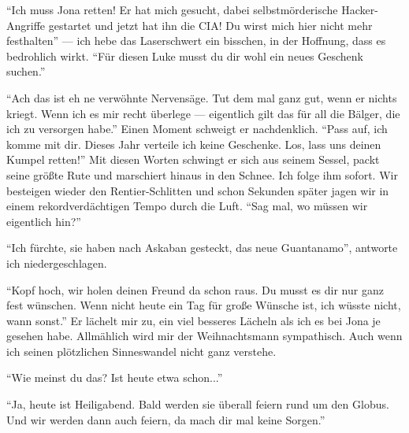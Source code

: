 "`Ich muss Jona retten! Er hat mich gesucht, dabei selbstmörderische Hacker-Angriffe gestartet und jetzt hat ihn die CIA! Du wirst mich hier nicht mehr festhalten"' — ich hebe das Laserschwert ein bisschen, in der Hoffnung, dass es bedrohlich wirkt. "`Für diesen Luke musst du dir wohl ein neues Geschenk suchen."'

"`Ach das ist eh ne verwöhnte Nervensäge. Tut dem mal ganz gut, wenn er nichts kriegt. Wenn ich es mir recht überlege — eigentlich gilt das für all die Bälger, die ich zu versorgen habe."' Einen Moment schweigt er nachdenklich. "`Pass auf, ich komme mit dir. Dieses Jahr verteile ich keine Geschenke. Los, lass uns deinen Kumpel retten!"' Mit diesen Worten schwingt er sich aus seinem Sessel, packt seine größte Rute und marschiert hinaus in den Schnee. Ich folge ihm sofort. Wir besteigen wieder den Rentier-Schlitten und schon Sekunden später jagen wir in einem rekordverdächtigen Tempo durch die Luft. "`Sag mal, wo müssen wir eigentlich hin?"'

"`Ich fürchte, sie haben nach Askaban gesteckt, das neue Guantanamo"', antworte ich niedergeschlagen.

"`Kopf hoch, wir holen deinen Freund da schon raus. Du musst es dir nur ganz fest wünschen. Wenn nicht heute ein Tag für große Wünsche ist, ich wüsste nicht, wann sonst."' Er lächelt mir zu, ein viel besseres Lächeln als ich es bei Jona je gesehen habe. Allmählich wird mir der Weihnachtsmann sympathisch. Auch wenn ich seinen plötzlichen Sinneswandel nicht ganz verstehe.

"`Wie meinst du das? Ist heute etwa schon..."'

"`Ja, heute ist Heiligabend. Bald werden sie überall feiern rund um den Globus. Und wir werden dann auch feiern, da mach dir mal keine Sorgen."'
